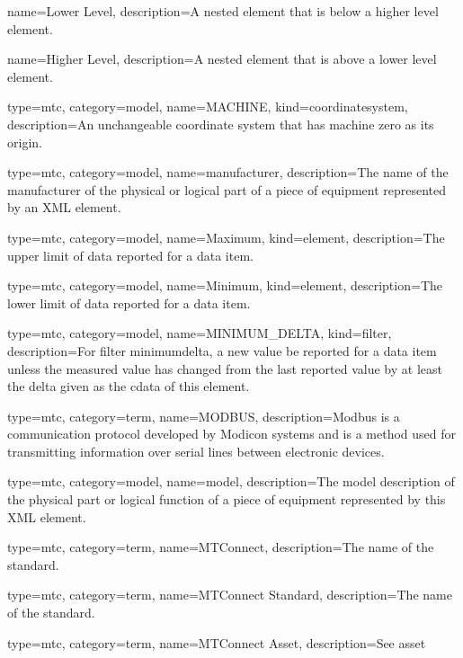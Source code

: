 {
  name={Lower Level},
  description={A nested element that is below a higher level element.}
}


{
  name={Higher Level},
  description={A nested element that is above a lower level element.}
}


{
  type=mtc,
  category=model,
  name={MACHINE},
  kind={coordinatesystem},
  description={An unchangeable coordinate system that has machine zero as its origin.}
}


{
  type=mtc,
  category=model,
  name={manufacturer},
  description={The name of the manufacturer of the physical or logical part of a piece of equipment represented by an XML element.}
}


{
  type=mtc,
  category=model,
  name={Maximum},
  kind={element},
  description={The upper limit of data reported for a data item.}
}


{
  type=mtc,
  category=model,
  name={Minimum},
  kind={element},
  description={The lower limit of data reported for a data item.}
}



{
  type=mtc,
  category=model,
  name={MINIMUM\_DELTA},
  kind={filter},
  description={For \gls{filter} \gls{minimumdelta}, a new value \MUSTNOT be reported for a data item unless the measured value has changed from the last reported value by at least the delta given as the \gls{cdata} of this element.}
}


{
  type=mtc,
  category=term,
  name={MODBUS},
  description={Modbus is a communication protocol developed by Modicon systems and is a method used for transmitting information over serial lines between electronic devices.}
}


{
  type=mtc,
  category=model,
  name={model},
  description={The model description of the physical part or logical function of a piece of equipment represented by this XML element.}
}


{
  type=mtc,
  category=term,
  name={MTConnect},
  description={The name of the standard.}
}

{
  type=mtc,
  category=term,
  name={MTConnect Standard},
  description={The name of the standard.}
}

{
  type=mtc,
  category=term,
  name={MTConnect Asset},
  description={See \gls{asset}}
}


